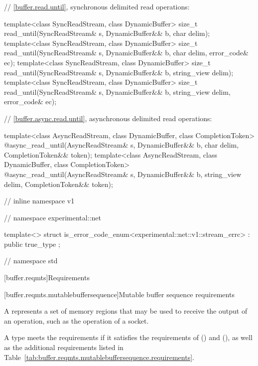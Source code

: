 \begin{codeblock}
{{{  // \ref{buffer.read.until}, synchronous delimited read operations:

  template<class SyncReadStream, class DynamicBuffer>
    size_t read_until(SyncReadStream& s, DynamicBuffer&& b, char delim);
  template<class SyncReadStream, class DynamicBuffer>
    size_t read_until(SyncReadStream& s, DynamicBuffer&& b,
                      char delim, error_code& ec);
  template<class SyncReadStream, class DynamicBuffer>
    size_t read_until(SyncReadStream& s, DynamicBuffer&& b, string_view delim);
  template<class SyncReadStream, class DynamicBuffer>
    size_t read_until(SyncReadStream& s, DynamicBuffer&& b,
                      string_view delim, error_code& ec);

  // \ref{buffer.async.read.until}, asynchronous delimited read operations:

  template<class AsyncReadStream, class DynamicBuffer, class CompletionToken>
    @\DEDUCED@ async_read_until(AsyncReadStream& s,
                             DynamicBuffer&& b, char delim,
                             CompletionToken&& token);
  template<class AsyncReadStream, class DynamicBuffer, class CompletionToken>
    @\DEDUCED@ async_read_until(AsyncReadStream& s,
                             DynamicBuffer&& b, string_view delim,
                             CompletionToken&& token);

} // inline namespace v1
} // namespace experimental::net

  template<> struct is_error_code_enum<experimental::net::v1::stream_errc>
    : public true_type {};

} // namespace std
\end{codeblock}



[buffer.reqmts]{Requirements}


[buffer.reqmts.mutablebuffersequence]{Mutable buffer sequence requirements}

\pnum
A  represents a set of memory regions that may be used to receive the output of an operation, such as the  operation of a socket.

\pnum
A type  meets the  requirements if it satisfies the requirements of  () and  (), as well as the additional requirements listed in Table~\ref{tab:buffer.reqmts.mutablebuffersequence.requirements}.


